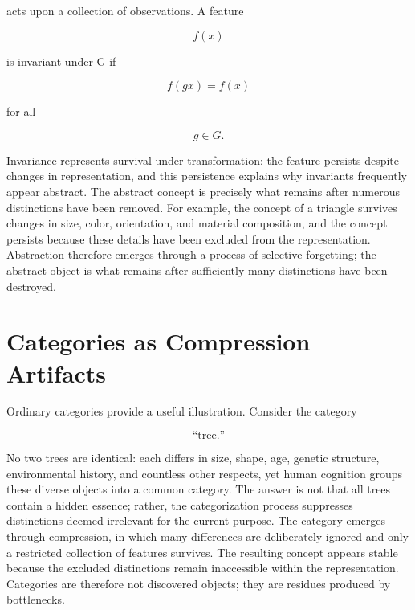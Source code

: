 \documentclass[11pt,oneside]{book}
\theoremstyle{plain}
\theoremstyle{definition}
\theoremstyle{remark}
\begin{document}
acts upon a collection of observations. A feature

\begin{equation}
f(x)
\end{equation}

is invariant under G if

\begin{equation}
f(gx)=f(x)
\end{equation}

for all

\begin{equation}
g
\in G.
\end{equation}

Invariance represents survival under transformation: the feature persists despite changes in representation, and this persistence explains why invariants frequently appear abstract. The abstract concept is precisely what remains after numerous distinctions have been removed. For example, the concept of a triangle survives changes in size, color, orientation, and material composition, and the concept persists because these details have been excluded from the representation. Abstraction therefore emerges through a process of selective forgetting; the abstract object is what remains after sufficiently many distinctions have been destroyed.

\section{Categories as Compression Artifacts}

Ordinary categories provide a useful illustration. Consider the category

\begin{equation}
\text{``tree.''}
\end{equation}

No two trees are identical: each differs in size, shape, age, genetic structure, environmental history, and countless other respects, yet human cognition groups these diverse objects into a common category. The answer is not that all trees contain a hidden essence; rather, the categorization process suppresses distinctions deemed irrelevant for the current purpose. The category emerges through compression, in which many differences are deliberately ignored and only a restricted collection of features survives. The resulting concept appears stable because the excluded distinctions remain inaccessible within the representation. Categories are therefore not discovered objects; they are residues produced by bottlenecks.
\end{document}
